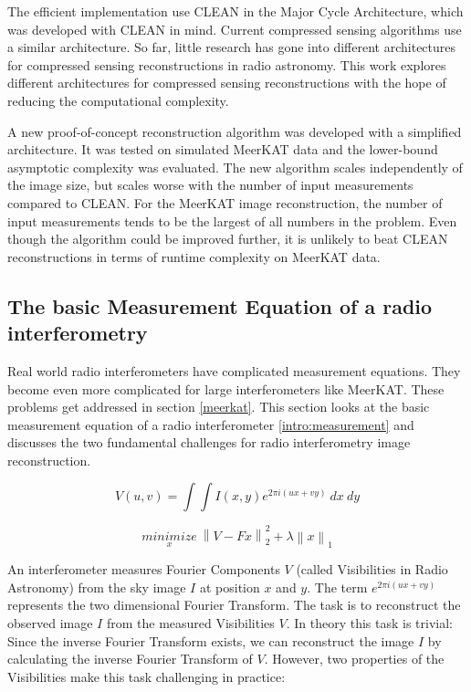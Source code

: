 The efficient implementation use CLEAN in the Major Cycle Architecture, which was developed with CLEAN in mind. Current compressed sensing algorithms use a similar architecture. So far, little research has gone into different architectures for compressed sensing reconstructions in radio astronomy. This work explores different architectures for compressed sensing reconstructions with the hope of reducing the computational complexity. 

A new proof-of-concept reconstruction algorithm was developed with a simplified architecture. It was tested on simulated MeerKAT data and the lower-bound asymptotic complexity was evaluated. The new algorithm scales independently of the image size, but scales worse with the number of input measurements compared to CLEAN. For the MeerKAT image reconstruction, the number of input measurements tends to be the largest of all numbers in the problem. Even though the algorithm could be improved further, it is unlikely to beat CLEAN reconstructions in terms of runtime complexity on MeerKAT data.


\subsection{The basic Measurement Equation of a radio interferometry}\label{intro:basic}
Real world radio interferometers have complicated measurement equations. They become even more complicated for large interferometers like MeerKAT. These problems get addressed in section \ref{meerkat}. This section looks at the basic measurement equation of a radio interferometer \eqref{intro:measurement} and discusses the two fundamental challenges for radio interferometry image reconstruction. 

\begin{equation}\label{intro:measurement}
V(u, v) = \int\int I(x, y) e^{2 \pi i (ux+vy)} \: dx \: dy
\end{equation}

\begin{equation}\label{intro:cs}
\underset{x}{minimize} \: \left \| V - Fx \right \|_2^2 + \lambda \left \| x \right \|_1
\end{equation}

An interferometer measures Fourier Components $V$ (called Visibilities in Radio Astronomy) from the sky image $I$ at position $x$ and $y$. The term $e^{2 \pi i (ux+vy)}$ represents the two dimensional Fourier Transform. The task is to reconstruct the observed image $I$ from the measured Visibilities $V$. In theory this task is trivial: Since the inverse Fourier Transform exists, we can reconstruct the image $I$ by calculating the inverse Fourier Transform of $V$. However, two properties of the Visibilities make this task challenging in practice:

